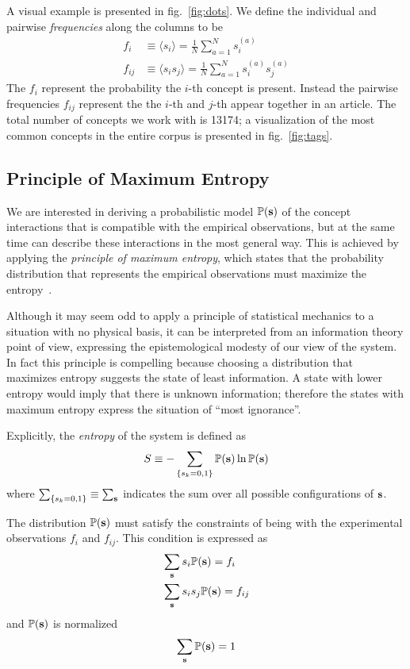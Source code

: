 \documentclass[a4paper,12pt,twoside]{article}
\def \be {\begin{equation}}
\def \ee {\end{equation}}
\def \bf {\textbf}
\def \P {{\mathbb{P}}}
\begin{document}
A visual example is presented in fig.~\ref{fig:dots}.
We define the individual and pairwise {\em frequencies} along the columns to be
\begin{subequations}
  \begin{align}
    f_i &\equiv \langle s_i \rangle = \frac{1}{N} \sum_{a=1}^N s_i^{(a)} \\
    f_{ij} &\equiv \langle s_i s_j \rangle = \frac{1}{N} \sum_{a=1}^N s_i^{(a)}s_j^{(a)}
  \end{align}
  \label{eq:fdef}
\end{subequations}
The $f_{i}$ represent the probability the $i$-th concept is present. 
Instead the pairwise frequencies $f_{ij}$ represent the the $i$-th and $j$-th appear together in an article.
The total number of concepts we work with is 13174; a visualization of the most common concepts in the entire corpus is presented in fig.~\ref{fig:tags}.

\subsection{Principle of Maximum Entropy}
We are interested in deriving a probabilistic model $\P(\bf s)$ of the concept interactions that is compatible with the empirical observations, but at the same time can describe these interactions in the most general way.
This is achieved by applying the {\em principle of maximum entropy}, which states that the probability distribution that represents the empirical observations must  maximize the entropy~\cite{jaynes1957}.

Although it may seem odd to apply a principle of statistical mechanics to a situation with no physical basis, it can be interpreted from an information theory point of view, expressing the epistemological modesty of our view of the system.
In fact this principle is compelling because choosing a distribution that maximizes entropy suggests the state of least information.
A state with lower entropy would imply that there is unknown information; therefore the states with maximum entropy express the situation of ``most ignorance''.

Explicitly, the {\em entropy} of the system is defined as
\be
  S \equiv - \sum_{\{s_k= 0,1\}} \P(\bf s) \ln \P(\bf s)
  \label{eq:sdef}
\ee
where $\sum_{\{s_k= 0,1\}} \equiv \sum_{\bf s}$ indicates the sum over all possible configurations of $\bf s$.

The distribution $\P(\bf s)$ must satisfy the constraints of being with the experimental observations $f_i$ and $f_{ij}$. This condition is expressed as
\begin{subequations}
  \begin{align}
    &\sum_{\bf s} s_i \P(\bf s) = f_i \\
    &\sum_{\bf s} s_i s_j \P(\bf s) = f_{ij} 
  \end{align}
  \label{eq:pconsistency}
\end{subequations}
and $\P(\bf s)$ is normalized
\be
  \sum_{\bf s} \P(\bf s) = 1
  \label{eq:pnorm}
\ee
\end{document}
